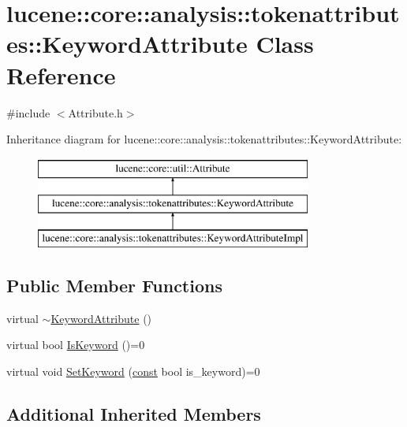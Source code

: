 \hypertarget{classlucene_1_1core_1_1analysis_1_1tokenattributes_1_1KeywordAttribute}{}\section{lucene\+:\+:core\+:\+:analysis\+:\+:tokenattributes\+:\+:Keyword\+Attribute Class Reference}
\label{classlucene_1_1core_1_1analysis_1_1tokenattributes_1_1KeywordAttribute}


{\ttfamily \#include $<$Attribute.\+h$>$}

Inheritance diagram for lucene\+:\+:core\+:\+:analysis\+:\+:tokenattributes\+:\+:Keyword\+Attribute\+:\begin{figure}[H]
\begin{center}
\leavevmode
\includegraphics[height=3.000000cm]{classlucene_1_1core_1_1analysis_1_1tokenattributes_1_1KeywordAttribute}
\end{center}
\end{figure}
\subsection*{Public Member Functions}
\begin{DoxyCompactItemize}
\item 
virtual \mbox{\hyperlink{classlucene_1_1core_1_1analysis_1_1tokenattributes_1_1KeywordAttribute_ad4ee53eaa0a2bd3b32e3f94c7be179e7}{$\sim$\+Keyword\+Attribute}} ()
\item 
virtual bool \mbox{\hyperlink{classlucene_1_1core_1_1analysis_1_1tokenattributes_1_1KeywordAttribute_af6270bf727324f1809a18a1fc9b1a27c}{Is\+Keyword}} ()=0
\item 
virtual void \mbox{\hyperlink{classlucene_1_1core_1_1analysis_1_1tokenattributes_1_1KeywordAttribute_aee23c674ba6af03521985734f739c9d5}{Set\+Keyword}} (\mbox{\hyperlink{ZlibCrc32_8h_a2c212835823e3c54a8ab6d95c652660e}{const}} bool is\+\_\+keyword)=0
\end{DoxyCompactItemize}
\subsection*{Additional Inherited Members}


